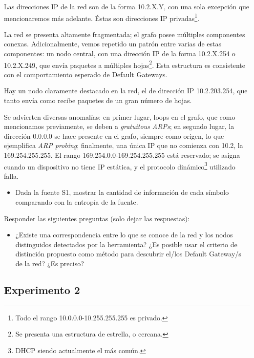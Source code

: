 \par Las direcciones IP de la red son de la forma 10.2.X.Y, con una sola excepción que mencionaremos más adelante.
Éstas son direcciones IP privadas\footnote{Todo el rango 10.0.0.0-10.255.255.255 es privado.}.

\par La red se presenta altamente fragmentada; el grafo posee múltiples componentes conexas.
Adicionalmente, vemos repetido un patrón entre varias de estas componentes: un nodo central, con una dirección IP de la forma 10.2.X.254 o 10.2.X.249, que envía paquetes a múltiples hojas\footnote{Se presenta una estructura de estrella, o cercana.}.
Esta estructura es consistente con el comportamiento esperado de Default Gateways. 

\par Hay un nodo claramente destacado en la red, el de dirección IP 10.2.203.254, que tanto envía como recibe paquetes de un gran número de hojas.

\par Se advierten diversas anomalías: en primer lugar, loops en el grafo, que como mencionamos previamente, se deben a \textit{gratuitous ARPs}; en segundo lugar, la dirección 0.0.0.0 se hace presente en el grafo, siempre como origen, lo que ejemplifica \textit{ARP probing}; finalmente, una única IP que no comienza con 10.2, la 169.254.255.255.
El rango 169.254.0.0-169.254.255.255 está reservado; se asigna cuando un dispositivo no tiene IP estática, y el protocolo dinámico\footnote{DHCP siendo actualmente el más común.} utilizado falla.

\begin{itemize}
	\item Dada la fuente S1, mostrar la cantidad de información de cada símbolo comparando con la entropía de la fuente.
\end{itemize}

Responder las siguientes preguntas (solo dejar las respuestas):

\begin{itemize}
	\item ¿Existe una correspondencia entre lo que se conoce de la red y los nodos distinguidos detectados por la herramienta? ¿Es posible usar el criterio de distinción propuesto como método para descubrir el/los Default Gateway/s de la red? ¿Es preciso?
\end{itemize}

\subsection{Experimento 2}

